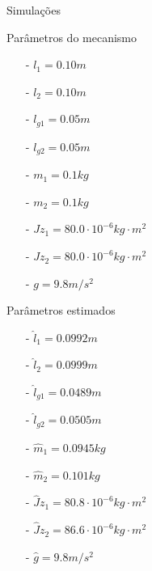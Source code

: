 \documentclass[25pt,landscape]{beamer}
\begin{document}
\begin{frame}{Simula\c{c}\~oes}
	\begin{block}{Par\^ametros do mecanismo}
		\begin{multicols}{2}
			\begin{itemize}
				\item[-] $l_1 = 0.10 m$
				\item[-] $l_2 = 0.10 m$
				\item[-] $l_{g1} = 0.05 m$
				\item[-] $l_{g2} = 0.05 m$
				\item[-] $m_1 = 0.1 kg$
				\item[-] $m_2 = 0.1 kg$
				\item[-] $Jz_1 = 80.0 \cdot 10^{-6} kg\cdot m^2$
				\item[-] $Jz_2 = 80.0 \cdot 10^{-6} kg\cdot m^2$
				\item[-] $g = 9.8 m/s^2$
			\end{itemize}
		\end{multicols}
	\end{block}
	\begin{block}{Par\^ametros estimados}
		\begin{multicols}{2}
			\begin{itemize}
				\item[-] $\hat{l}_1 = 0.0992 m$
				\item[-] $\hat{l}_2 = 0.0999 m$
				\item[-] $\hat{l}_{g1} = 0.0489 m$
				\item[-] $\hat{l}_{g2} = 0.0505 m$
				\item[-] $\hat{m}_1 = 0.0945 kg$
				\item[-] $\hat{m}_2 = 0.101 kg$
				\item[-] $\hat{J}z_1 = 80.8 \cdot 10^{-6} kg\cdot m^2$
				\item[-] $\hat{J}z_2 = 86.6 \cdot 10^{-6} kg\cdot m^2$
				\item[-] $\hat{g} = 9.8 m/s^2$
			\end{itemize}
		\end{multicols}
	\end{block}
\end{frame}
\end{document}

